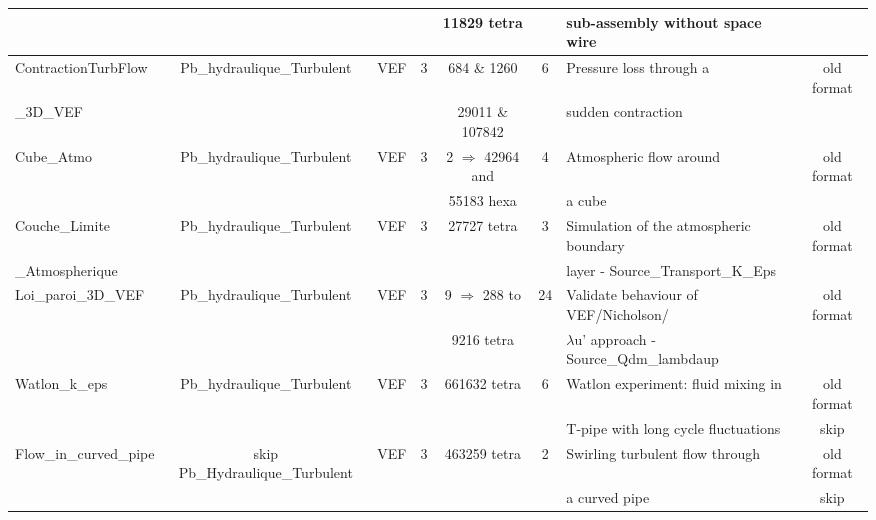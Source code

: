 \begin{table}[H]
\begin{centering}
\begin{tabular}{lclccclc}
\rowcolor{SkyBlue!10} & & & & 11829 tetra & & sub-assembly without space wire & \\ \hline
\rowcolor{SkyBlue!10}ContractionTurbFlow & Pb\_hydraulique\_Turbulent & VEF & 3 & 684 \& 1260 & 6 & Pressure loss through a  & old format \\ 
\rowcolor{SkyBlue!10}\_3D\_VEF & & & & 29011 \& 107842 & & sudden contraction & \\ \hline
\rowcolor{SkyBlue!10}Cube\_Atmo & Pb\_hydraulique\_Turbulent & VEF & 3 & 2 $\Rightarrow$ 42964 and & 4 & Atmospheric flow around & old format \\ 
\rowcolor{SkyBlue!10} & & & & 55183 hexa & & a cube &  \\ \hline
\rowcolor{SkyBlue!10}Couche\_Limite & Pb\_hydraulique\_Turbulent & VEF & 3 & 27727 tetra & 3 & Simulation of the atmospheric boundary & old format \\ 
\rowcolor{SkyBlue!10}\_Atmospherique & & & & & & layer - Source\_Transport\_K\_Eps & \\ \hline
\rowcolor{SkyBlue!10}Loi\_paroi\_3D\_VEF & Pb\_hydraulique\_Turbulent & VEF & 3 & 9 $\Rightarrow$ 288 to & 24 & Validate behaviour of VEF/Nicholson/ & old format \\ 
\rowcolor{SkyBlue!10} & & & & 9216 tetra & & $\lambda$u' approach - Source\_Qdm\_lambdaup & \\ \hline
\rowcolor{SkyBlue!10}Watlon\_k\_eps & Pb\_hydraulique\_Turbulent & VEF & 3 & 661632 tetra & 6 & Watlon experiment: fluid mixing in & old format \\ 
\rowcolor{SkyBlue!10} & & & & & & T-pipe with long cycle fluctuations & skip \\\hline \rowcolor{SkyBlue!10}Flow\_in\_curved\_pipe & skip Pb\_Hydraulique\_Turbulent & VEF & 3 & 463259 tetra & 2 & Swirling turbulent flow through & old format \\ 
\rowcolor{SkyBlue!10} & & & & & & a curved pipe & skip \\ \hline

	\end{tabular}
\end{centering}
\end{table}

\newpage

